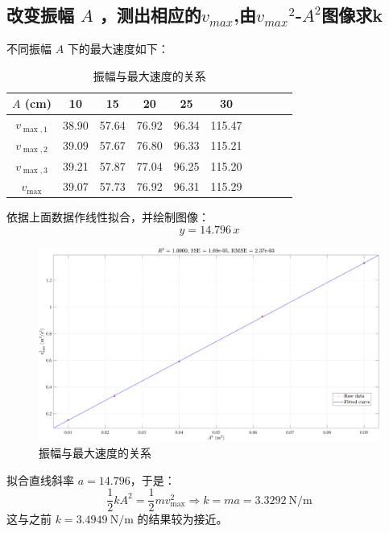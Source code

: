 \documentclass[UTF8]{article}
\theoremstyle{MyLineTheoremStyle} %
\theoremstyle{MyBlockTheoremStyle} %
\theoremstyle{MySubsubsectionStyle} %
\begin{document}
\subsection{改变振幅 $A$ ，测出相应的$v_{max}$,由${v_{max}}^2$-$A^2$图像求k}
不同振幅 $A$ 下的最大速度如下：
\begin{table}[H]\centering
    \caption{振幅与最大速度的关系}
    \label{振幅与最大速度的关系}
\begin{tabular}{cccccccccc}\toprule
    $A$ (cm) & 10 & 15 & 20 & 25 &30 \\
    \midrule
    $v_{\max, 1}$ &38.90	&57.64	&76.92	&96.34	&115.47 \\
    $v_{\max, 2}$ &39.09	&57.67	&76.80	&96.33	&115.21 \\
    $v_{\max, 3}$ &39.21	&57.87	&77.04	&96.25	&115.20 \\
    $v_{\max}$ &39.07	&57.73	&76.92	&96.31	&115.29 \\
    \bottomrule
\end{tabular}
\end{table}
    依据上面数据作线性拟合，并绘制图像：
\begin{equation}
y = 14.796 \, x 
\end{equation}

\begin{figure}[H]\centering
    \includegraphics[width=0.9\columnwidth]{assets/6.pdf}
    \caption{振幅与最大速度的关系}
\end{figure}
拟合直线斜率 $a = 14.796$，于是：
\begin{equation}
\frac{1}{2}k A^2 = \frac{1}{2} m v_{\max}^2 \Longrightarrow 
k = ma = 3.3292 \ \mathrm{N/m}
\end{equation}
这与之前 $k = 3.4949 \ \mathrm{N/m}$ 的结果较为接近。
\end{document}
